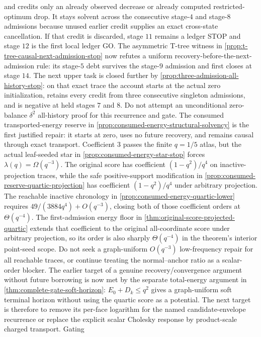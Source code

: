 \begin{enumerate}[leftmargin=2em]
and credits only an already observed decrease or already computed
restricted-optimum drop.  It stays solvent across the consecutive stage-$4$
and stage-$8$ admissions because unused earlier credit supplies an exact
cross-state cancellation.  If that credit is discarded, stage $11$ remains a
ledger STOP and stage $12$ is the first local ledger GO.  The asymmetric
T-tree witness in \cref{prop:t-tree-causal-next-admission-stop} now refutes a
uniform recovery-before-the-next-admission rule: its stage-$5$ debt survives
the stage-$9$ admission and first closes at stage $14$.  The next upper task is
closed further by \cref{prop:three-admission-all-history-stop}: on that exact
trace the account starts at the actual zero initialization, retains every
credit from three consecutive singleton admissions, and is negative at held
stages $7$ and $8$.  Do not attempt an unconditional zero-balance
$\delta^2$ all-history proof for this recurrence and gate.  The consumed
transported-energy reserve in
\cref{prop:consumed-energy-structural-solvency} is the first justified repair:
it starts at zero, uses no future recovery, and remains causal through exact
transport.  Coefficient $3$ passes the finite $q=1/5$ atlas, but the actual
leaf-seeded star in \cref{prop:consumed-energy-star-stop} forces
$\lambda(q)=\Omega(q^{-3})$.  The original score has coefficient
$(1-q^2)/q^4$ on
inactive-projection traces, while the safe positive-support modification in
\cref{prop:consumed-reserve-quartic-projection} has coefficient
$(1-q^2)/q^4$ under arbitrary projection.  The reachable inactive chronology
in \cref{prop:consumed-energy-quartic-lower} requires
$49/(3884q^4)+O(q^{-3})$, closing both of those coefficient orders at
$\Theta(q^{-4})$.  The first-admission energy floor in
\cref{thm:original-score-projected-quartic} extends that coefficient to the
original all-coordinate score under arbitrary projection, so its order is
also sharply $\Theta(q^{-4})$ in the theorem's interior point-seed scope.  Do
not seek a graph-uniform $O(q^{-3})$
low-frequency repair for all reachable traces, or continue treating the
normal--anchor ratio as a scalar-order blocker.  The earlier target of a
genuine recovery/convergence argument without future borrowing is now met by the separate
total-energy argument in \cref{thm:complete-gate-soft-horizon}:
$E_0+D_k\leq q^2$ gives a graph-uniform soft terminal horizon without using
the quartic score as a potential.  The next target is therefore to remove its
per-face logarithm for the named candidate-envelope recurrence or replace the
explicit scalar Cholesky response by product-scale charged transport.  Gating

\end{enumerate}
